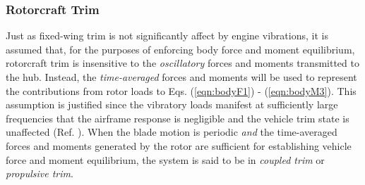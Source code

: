 \subsubsection{Rotorcraft Trim}
Just as fixed-wing trim is not significantly affect by engine vibrations, it is assumed that, for the purposes of enforcing body force and moment equilibrium, rotorcraft trim is insensitive to the \emph{oscillatory} forces and moments transmitted to the hub. Instead, the \emph{time-averaged} forces and moments will be used to represent the contributions from rotor loads to Eqs. (\ref{eqn:bodyF1}) - (\ref{eqn:bodyM3}). This assumption is justified since the vibratory loads manifest at sufficiently large frequencies that the airframe response is negligible and the vehicle trim state is unaffected (Ref. \cite{Kim}). When the blade motion is periodic \emph{and} the time-averaged forces and moments generated by the rotor are sufficient for establishing vehicle force and moment equilibrium, the system is said to be in \emph{coupled trim} or \emph{propulsive trim}. 
 
